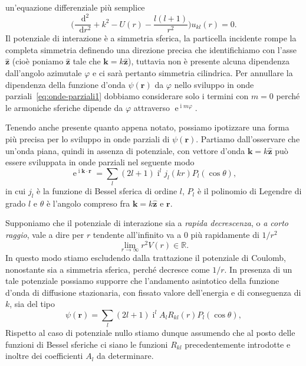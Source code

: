 \documentclass[a4paper,fleqn,twoside,12pt]{article}
\renewcommand{\phi}{\varphi}
\newcommand*{\dd}{\mathop{}\!\mathrm{d}} %
\DeclareMathOperator{\e}{\mathrm{e}} %
\DeclareMathOperator{\uimm}{\mathrm{i}} %
\newcommand*{\toder}[3][]{\frac{{\dd^{#1}}#2}{\dd {#3}^{#1}}}
\newcommand*{\versor}[1]{\hat{\bm{#1}}}
\begin{document}
un'equazione differenziale più semplice
\begin{equation}
  \label{eq:diff-u-op}
  \bigg(\toder[2]{}{r} + k^{2} - U(r) - \frac{l(l+1)}{r^{2}}\bigg)u_{kl}(r) = 0.
\end{equation}
Il potenziale di interazione è a simmetria sferica, la particella incidente
rompe la completa simmetria definendo una direzione precisa che identifichiamo
con l'asse $\versor{z}$ (cioè poniamo $\versor{z}$ tale che
$\bm{k} = k\versor{z}$), tuttavia non è presente alcuna dipendenza dall'angolo
azimutale $\phi$ e ci sarà pertanto simmetria cilindrica.  Per annullare la
dipendenza della funzione d'onda $\psi(\bm{r})$ da $\phi$ nello sviluppo in onde
parziali~\eqref{eq:onde-parziali1} dobbiamo considerare solo i termini con
$m = 0$ perché le armoniche sferiche dipende da $\phi$ attraverso
$\e^{\uimm m \phi}$.

Tenendo anche presente quanto appena notato, possiamo ipotizzare una forma più
precisa per lo sviluppo in onde parziali di $\psi(\bm{r})$.  Partiamo
dall'osservare che un'onda piana, quindi in assenza di potenziale, con vettore
d'onda $\bm{k} = k\versor{z}$ può essere sviluppata in onde parziali nel
seguente modo
\begin{equation}
  \label{eq:sviluppo-onda-piana}
  \e^{\uimm \bm{k}\cdot\bm{r}} = \sum_{l} (2l+1) \uimm^{l} j_{l}(kr)
  P_{l}(\cos\theta),
\end{equation}
in cui $j_{l}$ è la funzione di Bessel sferica di ordine $l$, $P_{l}$ è il
polinomio di Legendre di grado $l$ e $\theta$ è l'angolo compreso fra
$\bm{k} = k\versor{z}$ e $\bm{r}$.

Supponiamo che il potenziale di interazione sia a \emph{rapida decrescenza}, o
\emph{a corto raggio}, vale a dire per $r$ tendente all'infinito va a $0$ più
rapidamente di $1/r^{2}$
\begin{equation}
  \lim_{r \to \infty} r^{2}V(r) \in \mathbb{R}.
\end{equation}
In questo modo stiamo escludendo dalla trattazione il potenziale di Coulomb,
nonostante sia a simmetria sferica, perché decresce come $1/r$.  In presenza di
un tale potenziale possiamo supporre che l'andamento asintotico della funzione
d'onda di diffusione stazionaria, con fissato valore dell'energia e di
conseguenza di $k$, sia del tipo
\begin{equation}
  \label{eq:onde-parziali2}
  \psi(\bm{r}) = \sum_{l} (2l+1) \uimm^{l} A_{l} R_{kl}(r) P_{l}(\cos\theta),
\end{equation}
Rispetto al caso di potenziale nullo stiamo dunque assumendo che al posto delle
funzioni di Bessel sferiche ci siano le funzioni $R_{kl}$ precedentemente
introdotte e inoltre dei coefficienti $A_{l}$ da determinare.
\end{document}
